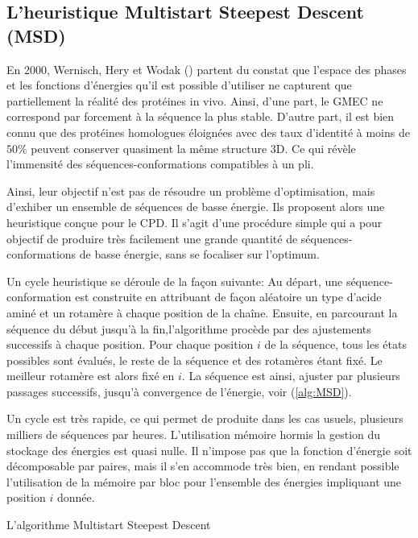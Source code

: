 \subsection{L'heuristique Multistart Steepest Descent (MSD)}
\label{MSD}
En 2000, Wernisch, Hery et Wodak  (\cite{Wernisch00}) partent du constat que l'espace des phases et les fonctions d'énergies qu'il est possible d'utiliser ne capturent que partiellement la réalité des protéines in vivo. Ainsi, d'une part, le GMEC ne correspond par forcement à la séquence la plus stable. D'autre part, il est bien connu que des protéines homologues éloignées avec des taux d'identité à moins de $50\%$ peuvent conserver quasiment la même structure 3D. Ce qui révèle l'immensité des séquences-conformations compatibles à un pli.

Ainsi, leur objectif n'est pas de résoudre un problème d'optimisation, mais d'exhiber un ensemble de séquences de basse énergie. Ils proposent alors une heuristique conçue pour le CPD. Il s'agit d'une procédure simple qui a pour objectif de produire très facilement une grande quantité de séquences-conformations de basse énergie, sans se focaliser sur l'optimum.

Un cycle heuristique se déroule de la façon suivante:
Au départ, une séquence-conformation est construite en attribuant de façon aléatoire un type d'acide aminé et un rotamère à chaque position de la chaîne. Ensuite, en parcourant la séquence du début jusqu'à la fin,l'algorithme procède par des ajustements successifs à chaque position. Pour chaque position $i$ de la séquence, tous les états possibles sont évalués, le reste de la séquence et des rotamères étant fixé. Le meilleur rotamère est alors fixé en $i$. La séquence est ainsi, ajuster par plusieurs passages successifs, jusqu'à convergence de l'énergie, voir (\ref{alg:MSD}).

Un cycle est très rapide, ce qui permet de produite dans les cas usuels, plusieurs milliers de séquences par heures. L'utilisation mémoire hormis la gestion du stockage des énergies est quasi nulle. Il n'impose pas que la fonction d'énergie soit décomposable par paires, mais il s'en accommode très bien, en rendant possible l'utilisation de la mémoire par bloc pour l'ensemble des énergies impliquant une position $i$ donnée.

\begin{algorithm}
  \label{alg:MSD}
  \caption{L'algorithme Multistart Steepest Descent}
\end{algorithm}


